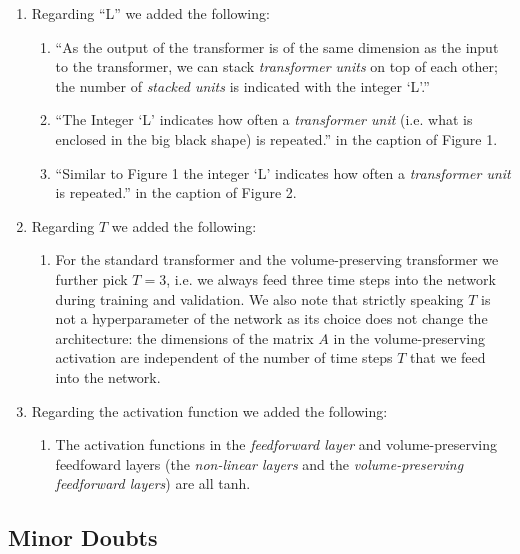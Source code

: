 \documentclass{article}
\begin{document}
\begin{enumerate}
    {
        \color{mred}

    \begin{enumerate}
        \item Regarding ``L'' we added the following: 
            \begin{enumerate}
                \item ``As the output of the transformer is of the same dimension as the input to the transformer, we can stack \textit{transformer units} on top of each other; the number of \textit{stacked units} is indicated with the integer `L'.''
                \item ``The Integer `L' indicates how often a \textit{transformer unit} (i.e. what is enclosed in the big black shape) is repeated.'' in the caption of Figure 1.
                \item  ``Similar to Figure 1 the integer `L' indicates how often a \textit{transformer unit} is repeated.'' in the caption of Figure 2.
            \end{enumerate}
        \item Regarding $T$ we added the following:
            \begin{enumerate}
                \item For the standard transformer and the volume-preserving transformer we further pick $T = 3$, i.e. we always feed three time steps into the network during training and validation. We also note that strictly speaking $T$ is not a hyperparameter of the network as its choice does not change the architecture: the dimensions of the matrix $A$ in the volume-preserving activation are independent of the number of time steps $T$ that we feed into the network.
            \end{enumerate}
        \item Regarding the activation function we added the following:
            \begin{enumerate}
                \item The activation functions in the \textit{feedforward layer} and volume-preserving feedfoward layers (the \textit{non-linear layers} and the \textit{volume-preserving feedforward layers}) are all tanh.
            \end{enumerate}
    \end{enumerate}

    }
\end{enumerate}

\subsection*{Minor Doubts}
\end{document}
